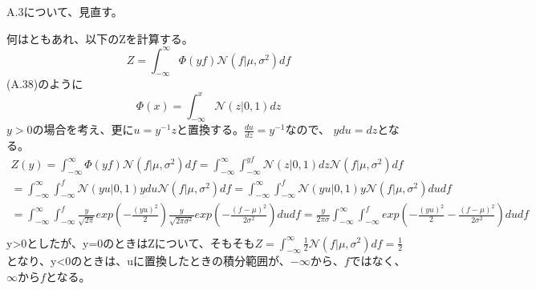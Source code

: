 \documentclass{jsarticle}
\begin{document}
A.3について、見直す。

何はともあれ、以下のZを計算する。
\begin{equation}
Z = \int^{\infty}_{-\infty} \Phi(yf) \mathcal{N}(f | \mu, \sigma^2) df
\end{equation}
(A.38)のように
\begin{equation}
\Phi(x) = \int^{x}_{-\infty} \mathcal{N}(z | 0, 1)dz
\end{equation}
$y>0$の場合を考え、更に$u = y^{-1}z$と置換する。$\frac{du}{dz} = y^{-1}$なので、
$ydu = dz$となる。
\begin{equation}
\begin{split}
Z(y) = \int^{\infty}_{-\infty} \Phi(yf) \mathcal{N}(f | \mu, \sigma^2) df
= \int^{\infty}_{-\infty}  \int^{yf}_{-\infty} \mathcal{N}(z | 0, 1)dz \mathcal{N}(f | \mu, \sigma^2) df\\
= \int^{\infty}_{-\infty}  \int^{f}_{-\infty} \mathcal{N}(yu | 0, 1)ydu \mathcal{N}(f | \mu, \sigma^2) df
= \int^{\infty}_{-\infty}  \int^{f}_{-\infty} \mathcal{N}(yu | 0, 1)y \mathcal{N}(f | \mu, \sigma^2) dudf\\
= \int^{\infty}_{-\infty}  \int^{f}_{-\infty} \frac{y}{\sqrt{2\pi}}exp(-\frac{(yu)^2}{2}) \frac{y}{\sqrt{2\pi\sigma^2}}exp(-\frac{(f - \mu)^2}{2\sigma^2}) dudf
= \frac{y}{2\pi\sigma} \int^{\infty}_{-\infty}  \int^{f}_{-\infty} exp(-\frac{(yu)^2}{2} - \frac{(f - \mu)^2}{2\sigma^2}) dudf\\
\end{split}
\end{equation}
y>0としたが、y=0のときはZについて、そもそも$Z = \int^{\infty}_{-\infty} \frac{1}{2} \mathcal{N}(f | \mu, \sigma^2) df = \frac{1}{2}$となり、y<0のときは、uに置換したときの積分範囲が、$-\infty$から、$f$ではなく、$\infty$から$f$となる。
\end{document}
